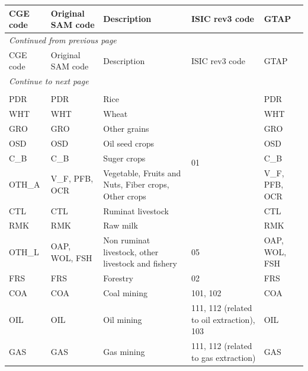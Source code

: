 \documentclass[10pt,a4paper,titlepage,dvipdfmx]{book}
\begin{document}
\begin{tabularx}{\textwidth}{|
p{}|
p{}|
p{}|
p{}|
p{}|} 
\caption{\label{tab:List of sectors} List of sectors} \\
 \hline
CGE code & Original SAM code & Description & ISIC rev3 code & GTAP \\ \hline\hline
 \endfirsthead
 \multicolumn{5}{l}{\small\it Continued from previous page}\\
 \hline
CGE code & Original SAM code & Description & ISIC rev3 code & GTAP \\ \hline\hline
 \endhead
 \hline
 \multicolumn{5}{l}{\small\it Continue to next page}\\
 \endfoot
 \hline
 \multicolumn{4}{l}{\small\it End}\\
 \endlastfoot
\hline
PDR & PDR & Rice & \multirow{8}{=}{01}  & PDR \\\cline{1-3}\cline{5-5}
WHT & WHT & Wheat &  &  WHT \\\cline{1-3}\cline{5-5}
GRO & GRO & Other grains &  &  GRO \\\cline{1-3}\cline{5-5}
OSD & OSD & Oil seed crops &  &  OSD \\\cline{1-3}\cline{5-5}
C\_B &  C\_B & Suger crops &  &  C\_B \\\cline{1-3}\cline{5-5}
OTH\_A & V\_F, PFB, OCR & Vegetable, Fruits and Nuts, Fiber crops, Other crops &  & V\_F, PFB, OCR \\\cline{1-3}\cline{5-5}
CTL & CTL & Ruminat livestock &  & CTL \\\cline{1-3}\cline{5-5}
RMK & RMK & Raw milk &  & RMK \\\hline 
OTH\_L & OAP, WOL, FSH & Non ruminat livestock, other livestock and fishery & 05 & OAP, WOL, FSH \\\hline 
FRS & FRS & Forestry & 02 & FRS \\\hline 
COA & COA & Coal mining & 101, 102 & COA \\\hline 
OIL & OIL & Oil mining & 111, 112 (related to oil extraction), 103 & OIL \\\hline 
GAS & GAS & Gas mining & 111, 112 (related to gas extraction) & GAS \\\hline 

\end{tabularx}
\end{document}
